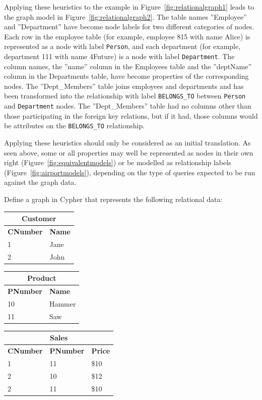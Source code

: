 Applying these heuristics to the example in Figure~\ref{fig:relationalgraph1} leads to the graph model in Figure~\ref{fig:relationalgraph2}. The table names ''Employee'' and ''Department'' have become node labels for two different categories of nodes. Each row in the employee table (for example, employee 815 with name Alice) is represented as a node with label \texttt{Person}, and each department (for example, department 111 with name 4Future) is a node with label \texttt{Department}. The column names, the ''name'' column in the Employees table and the ''deptName'' column in the Departments table, have become properties of the corresponding nodes. The ''Dept\_Members'' table joins employees and departments and has been transformed into the relationship with label \texttt{BELONGS\_TO} between \texttt{Person} and \texttt{Department} nodes. The ''Dept\_Members'' table had no columns other than those participating in the foreign key relations, but if it had, those columns would be attributes on the \texttt{BELONGS\_TO} relationship.

Applying these heuristics should only be considered as an initial translation. As seen above, some or all properties may well be represented as nodes in their own right (Figure~\ref{fig:equivalentmodels}) or be modelled as relationship labels (Figure~\ref{fig:airportmodels}), depending on the type of queries expected to be run against the graph data.

\begin{exerciseboxpaper}
Define a graph in Cypher that represents the following relational data: \\ 

\renewcommand{\arraystretch}{1.25}
\begin{tabular}{l|l} \hline
\multicolumn{2}{c}{\bf Customer} \\ \hline
{\bf CNumber} & {\bf Name} \\ \hline
1 & Jane \\
2 & John \\ \hline
\end{tabular}

\vspace{.5\baselineskip}
\renewcommand{\arraystretch}{1.25}
\begin{tabular}{l|l} \hline
\multicolumn{2}{c}{\bf Product} \\ \hline
{\bf PNumber} & {\bf Name} \\ \hline
10 & Hammer \\
11 & Saw \\ \hline
\end{tabular}

\vspace{.5\baselineskip}
\renewcommand{\arraystretch}{1.25}
\begin{tabular}{l|l|l} \hline
\multicolumn{3}{c}{\bf Sales} \\ \hline
{\bf CNumber} & {\bf PNumber} & {\bf Price} \\ \hline
1 & 11 & \$10 \\ 
2 & 10 & \$12 \\
2 & 11 & \$10 \\ \hline
\end{tabular}
\end{exerciseboxpaper}


